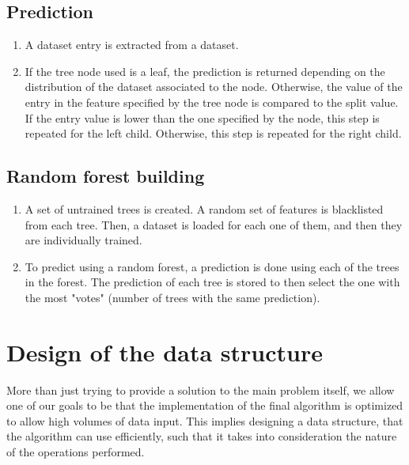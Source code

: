 \documentclass{acm_proc_article-sp}
\begin{document}
\subsection{Prediction}
\begin{enumerate}
  \item A dataset entry is extracted from a dataset.
  \item If the tree node used is a leaf, the prediction is returned depending on the distribution of the dataset associated to the node. Otherwise, the value of the entry in the feature specified by the tree node is compared to the split value. If the entry value is lower than the one specified by the node, this step is repeated for the left child. Otherwise, this step is repeated for the right child.
\end{enumerate}
\subsection{Random forest building}
\begin{enumerate}
  \item A set of untrained trees is created. A random set of features is blacklisted from each tree. Then, a dataset is loaded for each one of them, and then they are individually trained.
  \item To predict using a random forest, a prediction is done using each of the trees in the forest. The prediction of each tree is stored to then select the one with the most "votes" (number of trees with the same prediction).
\end{enumerate}

\section{Design of the data structure}
More than just trying to provide a solution to the main problem itself, we allow one of our goals to be that the implementation of the final algorithm is optimized to allow high volumes of data input. This implies designing a data structure, that the algorithm can use efficiently, such that it takes into consideration the nature of the operations performed.
\end{document}
